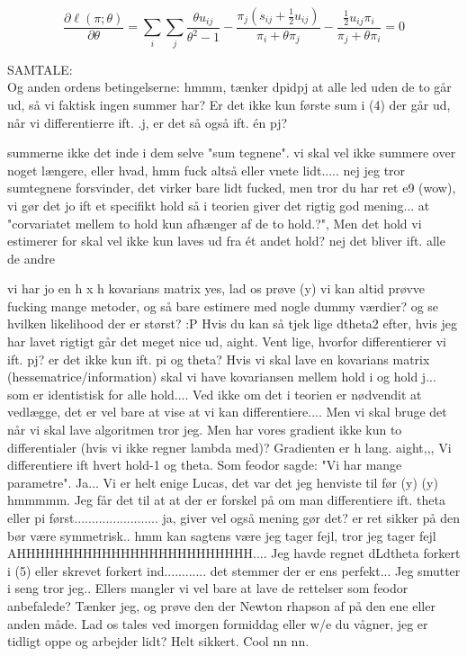 \documentclass[11pt,a4paper]{article}
\begin{document}
\begin{equation}
\frac{\partial \ell(\pi;\theta)}{\partial \theta}=\sum_i\sum_j
\frac{\theta u_{ij}}{\theta^2-1}
- \frac{\pi_j(s_{ij}+\frac{1}{2}u_{ij})}{\pi_i+\theta \pi_j}
- \frac{\frac{1}{2}u_{ij}\pi_i}{\pi_j+\theta \pi_i}=0
\end{equation}

\newpage
SAMTALE: \\
Og anden ordens betingelserne: hmmm, tænker dpidpj at alle led uden de to går ud, så vi faktisk ingen summer har? Er det ikke kun første sum i (4) der går ud, når vi differentierre ift. .j, er det så også ift. én pj?

summerne ikke det inde i dem
selve "sum tegnene". vi skal vel ikke summere over noget længere, eller hvad, hmm fuck altså eller vnete lidt..... nej jeg tror sumtegnene forsvinder, det virker bare lidt fucked, men tror du har ret e9 (wow), vi gør det jo ift et specifikt hold så i teorien giver det rigtig god mening... at "corvariatet mellem to hold kun afhænger af de to hold.?", Men det hold vi estimerer for skal vel ikke kun laves ud fra ét andet hold? nej det bliver ift. alle de andre

vi har jo en h x h kovarians matrix yes, lad os prøve (y) vi kan altid prøvve fucking mange metoder, og så bare estimere med nogle dummy værdier? og se hvilken likelihood der er størst? :P
Hvis du kan så tjek lige dtheta2 efter, hvis jeg har lavet rigtigt går det meget nice ud, aight. Vent lige, hvorfor differentierer vi ift. pj? er det ikke kun ift. pi og theta? Hvis vi skal lave en kovarians matrix (hessematrice/information) skal vi have kovariansen mellem hold i og hold j... som er identistisk for alle hold.... Ved ikke om det i teorien er nødvendit at vedlægge, det er vel bare at vise at vi kan differentiere.... Men vi skal bruge det når vi skal lave algoritmen tror jeg. Men har vores gradient ikke kun to differentialer (hvis vi ikke regner lambda med)? Gradienten er h lang. aight,,, Vi differentiere ift hvert hold-1 og theta. Som feodor sagde: "Vi har mange parametre". Ja...
Vi er helt enige Lucas, det var det jeg henviste til før (y) (y) hmmmmm. Jeg får det til at at der er forskel på om man differentiere ift. theta eller pi først........................ ja, giver vel også mening gør det? er ret sikker på den bør være symmetrisk.. hmm kan sagtens være jeg tager fejl, tror jeg tager fejl AHHHHHHHHHHHHHHHHHHHHHHHHH.... Jeg havde regnet dLdtheta forkert i (5) eller skrevet forkert ind............ det stemmer der er ens perfekt... Jeg smutter i seng tror jeg.. Ellers mangler vi vel bare at lave de rettelser som feodor anbefalede? Tænker jeg, og prøve den der Newton rhapson af på den ene eller anden måde. Lad os tales ved imorgen formiddag eller w/e du vågner, jeg er tidligt oppe og arbejder lidt? Helt sikkert. Cool nn nn.
\newpage
\end{document}
